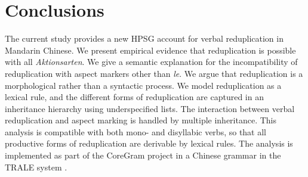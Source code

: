\section{Conclusions}\label{sec:conclu}

The current study provides a new HPSG account for verbal reduplication in Mandarin Chinese.
We present empirical evidence that reduplication is possible with all \textit{Aktionsarten}.
We give a semantic explanation for the incompatibility of reduplication with aspect markers other than \textit{le}.
We argue that reduplication is a morphological rather than a syntactic process.
We model reduplication as a lexical rule,
and the different forms of reduplication are captured in an inheritance hierarchy using underspecified lists.
The interaction between verbal reduplication and aspect marking is handled by multiple inheritance.
This analysis is compatible with both mono- and disyllabic verbs, 
so that all productive forms of reduplication are derivable by lexical rules.
The analysis is implemented as part of the CoreGram project \citep{MuellerCoreGram} in a Chinese
grammar in the TRALE system \citep{MeurersEtAl2002, Penn2004}.

